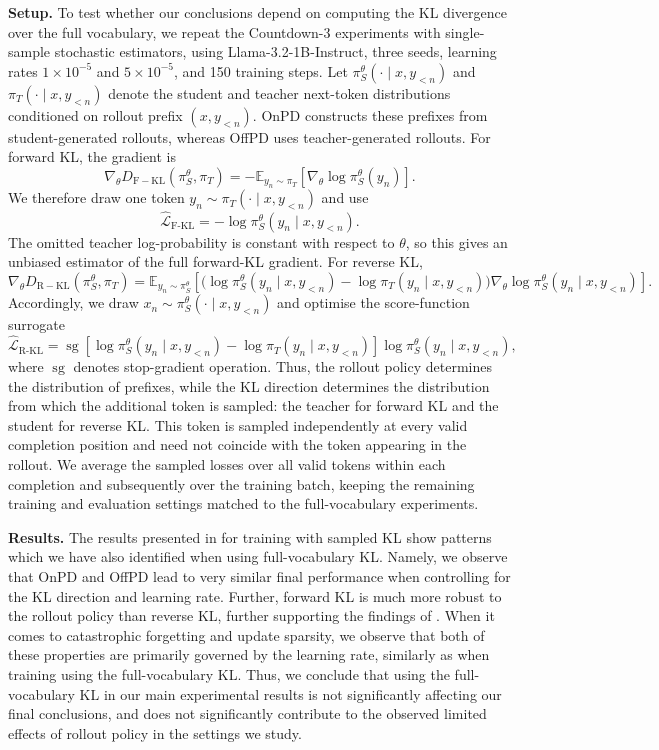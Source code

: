 \documentclass{article} %
\theoremstyle{plain}
\theoremstyle{definition}
\theoremstyle{remark}
\begin{document}
\textbf{Setup.} To test whether our conclusions depend on computing the KL divergence over the full vocabulary, we repeat the Countdown-3 experiments with single-sample stochastic estimators, using Llama-3.2-1B-Instruct, three seeds, learning rates \(1\times10^{-5}\) and \(5\times10^{-5}\), and 150 training steps. Let $\pi_S^\theta(\cdot\mid x, y_{<n})$ and $\pi_T(\cdot\mid x, y_{<n})$ denote the student and teacher next-token distributions conditioned on rollout prefix $(x, y_{<n})$. OnPD constructs these prefixes from student-generated rollouts, whereas OffPD uses teacher-generated rollouts. For forward KL, the gradient is
\[
\nabla_\theta D_{\mathrm{F-KL}}(\pi^\theta_S, \pi_T)
=
-\mathbb{E}_{y_n\sim \pi_T}
\left[\nabla_\theta\log \pi^\theta_S(y_n)\right].
\]
We therefore draw one token \(y_n\sim \pi_T(\cdot\mid x,y_{<n})\) and use
\[
\widehat{\mathcal L}_{\mathrm{F\text{-}KL}}
=
-\log \pi_S^\theta(y_n\mid x, y_{<n}).
\]
The omitted teacher log-probability is constant with respect to \(\theta\), so this gives an unbiased estimator of the full forward-KL gradient. For reverse KL,
\[
\nabla_\theta D_{\mathrm{R-KL}}(\pi^\theta_S, \pi_T)
=
\mathbb{E}_{y_n\sim \pi_S^\theta}
\left[
\bigl(\log \pi_S^\theta(y_n\mid x, y_{<n})-\log \pi_T(y_n\mid x, y_{<n})\bigr)
\nabla_\theta\log \pi_S^\theta(y_n\mid x, y_{<n})
\right].
\]
Accordingly, we draw \(x_n\sim \pi_S^\theta(\cdot\mid x, y_{<n})\) and optimise the score-function surrogate
\[
\widehat{\mathcal L}_{\mathrm{R\text{-}KL}}
=
\operatorname{sg}\!\left[
\log \pi_S^\theta(y_n\mid x, y_{<n})-\log \pi_T(y_n\mid x, y_{<n})
\right]
\log \pi_S^\theta(y_n\mid x, y_{<n}),
\]
where \(\operatorname{sg}\) denotes stop-gradient operation. Thus, the rollout policy determines the distribution of prefixes, while the KL direction determines the distribution from which the additional token is sampled: the teacher for forward KL and the student for reverse KL. This token is sampled independently at every valid completion position and need not coincide with the token appearing in the rollout. We average the sampled losses over all valid tokens within each completion and subsequently over the training batch, keeping the remaining training and evaluation settings matched to the full-vocabulary experiments.

\textbf{Results.} The results presented in  for training with sampled KL show patterns which we have also identified when using full-vocabulary KL. Namely, we observe that OnPD and OffPD lead to very similar final performance when controlling for the KL direction and learning rate. Further, forward KL is much more robust to the rollout policy than reverse KL, further supporting the findings of . When it comes to catastrophic forgetting and update sparsity, we observe that both of these properties are primarily governed by the learning rate, similarly as when training using the full-vocabulary KL. Thus, we conclude that using the full-vocabulary KL in our main experimental results is not significantly affecting our final conclusions, and does not significantly contribute to the observed limited effects of rollout policy in the settings we study.
\end{document}
